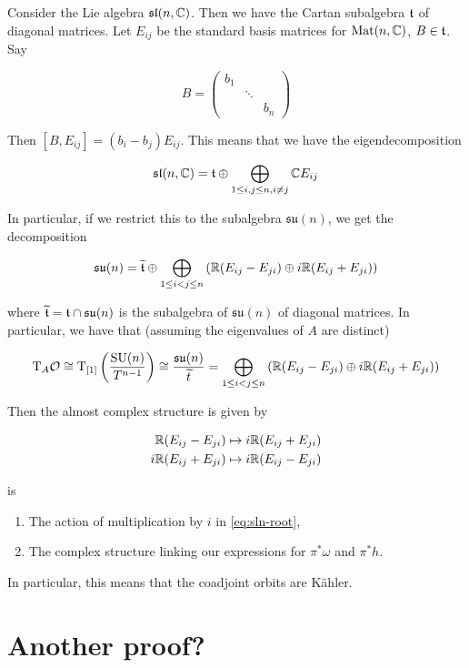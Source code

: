 \documentclass{article}
\DeclareMathOperator{\SU}{SU}
\newcommand{\su}{\mathfrak{su}}
\renewcommand{\sl}{\mathfrak{sl}}
\renewcommand{\tilde}{\widetilde}
\begin{document}
Consider the Lie algebra \(\sl(n, \C)\). Then we have the Cartan subalgebra \(\mathfrak{t}\) of diagonal matrices. Let \(E_{ij}\) be the standard basis matrices for \(\operatorname{Mat}(n, \mathbb{C})\), \(B \in \mathfrak{t}\). Say

\[B = \begin{pmatrix}
    b_1 \\
    & \ddots \\
    & & b_n
\end{pmatrix}\]

Then \([B, E_{ij}] = (b_i - b_j)E_{ij}\). This means that we have the eigendecomposition

\begin{equation}
    \label{eq:sln-root}
    \sl(n, \C) = \mft \oplus \bigoplus_{1 \le i, j \le n, i \ne j} \C E_{ij}
\end{equation}

In particular, if we restrict this to the subalgebra \(\su(n)\), we get the decomposition

\[\su(n) = \tilde\mft \oplus \bigoplus_{1 \le i < j \le n} \left(\R(E_{ij} - E_{ji}) \oplus i\R (E_{ij} + E_{ji})\right)\]

where \(\tilde \mft = \mft \cap \su(n)\) is the subalgebra of \(\su(n)\) of diagonal matrices. In particular, we have that (assuming the eigenvalues of \(A\) are distinct)

\[\T_A\mcO \cong \T_{[1]}\left(\frac{\SU(n)}{T^{n-1}}\right) \cong \frac{\su(n)}{\tilde t} = \bigoplus_{1 \le i < j \le n} \left(\R(E_{ij} - E_{ji}) \oplus i\R (E_{ij} + E_{ji})\right)\]

Then the almost complex structure is given by

\begin{align*}
    \mathbb{R}(E_{ij} - E_{ji}) &\mapsto i\mathbb{R}(E_{ij} + E_{ji}) \\
    i\mathbb{R}(E_{ij} + E_{ji}) &\mapsto i\mathbb{R}(E_{ij} - E_{ji})
\end{align*}

is

\begin{enumerate}
    \item The action of multiplication by \(i\) in \cref{eq:sln-root},
    \item The complex structure linking our expressions for \(\pi^*\omega\) and \(\pi^*h\).
\end{enumerate}

In particular, this means that the coadjoint orbits are K\"ahler.

\section{Another proof?}
\end{document}
